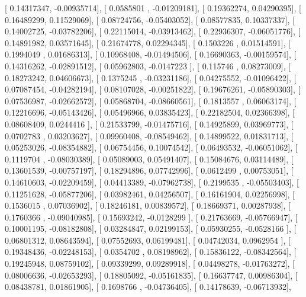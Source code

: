 \documentclass{article}
\begin{document}
       [ 0.14317347, -0.00935714],
       [ 0.0585801 , -0.01209181],
       [ 0.19362274,  0.04290395],
       [ 0.16489299,  0.11529069],
       [ 0.08724756, -0.05403052],
       [ 0.08577835,  0.10337337],
       [ 0.14002725, -0.03782206],
       [ 0.22115014, -0.03913462],
       [ 0.22936307, -0.06051776],
       [ 0.14891982,  0.03571645],
       [ 0.21674778,  0.02294345],
       [ 0.1503226 ,  0.01514591],
       [ 0.1994049 ,  0.01686313],
       [ 0.10968408, -0.01494506],
       [ 0.16690363, -0.00159574],
       [ 0.14316262, -0.02891512],
       [ 0.05962803, -0.0147223 ],
       [ 0.115746  ,  0.08273009],
       [ 0.18273242,  0.04606673],
       [ 0.1375245 , -0.03231186],
       [ 0.04275552, -0.01096422],
       [ 0.07087454, -0.04282194],
       [ 0.08107028, -0.00251822],
       [ 0.19676261, -0.05890303],
       [ 0.07536987, -0.02662572],
       [ 0.05868704, -0.08660561],
       [ 0.1813557 ,  0.06063174],
       [ 0.12216696, -0.05143426],
       [ 0.05496966,  0.03835423],
       [ 0.22182504,  0.02366398],
       [ 0.08608409,  0.0244416 ],
       [ 0.21533799, -0.01475716],
       [ 0.14925899,  0.03969773],
       [ 0.0702783 ,  0.03203627],
       [ 0.09960408, -0.08549462],
       [ 0.14899522,  0.01831713],
       [ 0.05253026, -0.08354882],
       [ 0.06754456,  0.10074542],
       [ 0.06493532, -0.06051062],
       [ 0.1119704 , -0.08030389],
       [ 0.05089003,  0.05491407],
       [ 0.15084676,  0.03114489],
       [ 0.13601539, -0.00757197],
       [ 0.18294896,  0.07742996],
       [ 0.0612499 ,  0.00753051],
       [ 0.14610603, -0.02209459],
       [ 0.04413389, -0.07962738],
       [ 0.2199535 , -0.05503403],
       [ 0.11251628, -0.05877206],
       [ 0.03982461,  0.04256507],
       [ 0.16161904,  0.02256998],
       [ 0.1536015 ,  0.07036902],
       [ 0.18246181,  0.00839572],
       [ 0.18669371,  0.00287938],
       [ 0.1760366 , -0.09040985],
       [ 0.15693242, -0.0128299 ],
       [ 0.21763669, -0.05766947],
       [ 0.10001195, -0.08182808],
       [ 0.03284847,  0.02199153],
       [ 0.05930255, -0.0528166 ],
       [ 0.06801312,  0.08643594],
       [ 0.07552693,  0.06199481],
       [ 0.04742034,  0.0962954 ],
       [ 0.19348436, -0.02248153],
       [ 0.0354702 ,  0.08198962],
       [ 0.15836122, -0.08342564],
       [ 0.19245948,  0.08759102],
       [ 0.09339299,  0.09289918],
       [ 0.04498278, -0.01763272],
       [ 0.08006636, -0.02653293],
       [ 0.18805092, -0.05161835],
       [ 0.16637747,  0.00986304],
       [ 0.08438781,  0.01861905],
       [ 0.1698766 , -0.04736405],
       [ 0.14178639, -0.06713932],
\end{document}
